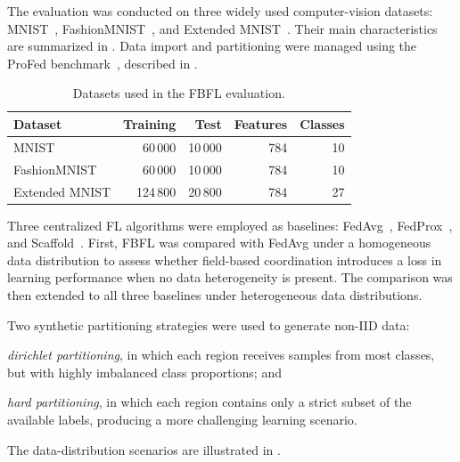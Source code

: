 The evaluation was conducted on three widely used computer-vision datasets:
 MNIST~\cite{lecun2010mnist},
 FashionMNIST~\cite{DBLP:journals/corr/abs-1708-07747}, and
 Extended MNIST~\cite{DBLP:journals/corr/CohenATS17}.
%
Their main characteristics are summarized in .
%
Data import and partitioning were managed using the ProFed benchmark~\cite{DBLP:journals/jors/DominiIALV26}, 
 described in .

\begin{table}[t]
  \centering
  \caption{Datasets used in the FBFL evaluation.}
  \label{tab:fbfl-datasets}
  \begin{tabular}{lrrrr}
    \toprule
    \textbf{Dataset}
      & \textbf{Training}
      & \textbf{Test}
      & \textbf{Features}
      & \textbf{Classes} \\
    \midrule
    MNIST
      & 60\,000
      & 10\,000
      & 784
      & 10 \\
    FashionMNIST
      & 60\,000
      & 10\,000
      & 784
      & 10 \\
    Extended MNIST
      & 124\,800
      & 20\,800
      & 784
      & 27 \\
    \bottomrule
  \end{tabular}
\end{table}

Three centralized \gls{FL} algorithms were employed as baselines:
 \gls{FedAvg}~\cite{DBLP:conf/aistats/McMahanMRHA17},
 FedProx~\cite{DBLP:conf/mlsys/LiSZSTS20}, 
 and Scaffold~\cite{DBLP:conf/icml/KarimireddyKMRS20}.
%
First, 
 \gls{FBFL} was compared with \gls{FedAvg} under a homogeneous data distribution 
 to assess whether field-based coordination introduces a loss in learning performance 
 when no data heterogeneity is present.
%
The comparison was then extended to all three baselines under heterogeneous data distributions.

Two synthetic partitioning strategies were used to generate non-\gls{IID} data:
%
\begin{enumerate*}[label=(\roman*)]
  \item
  \emph{dirichlet partitioning}, in which each region receives samples from  most classes,
   but with highly imbalanced class proportions; and
  \item
  \emph{hard partitioning}, in which each region contains only a strict subset
  of the available labels, producing a more challenging learning scenario.
\end{enumerate*}
%
The data-distribution scenarios are illustrated in .

